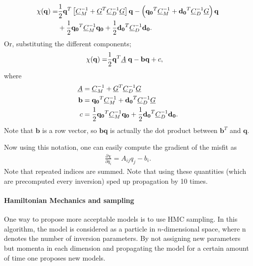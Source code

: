 \begin{align}
	\chi(\mathbf{q}) =
	&\frac{1}{2} \mathbf{q}^T \left[\underline{C}_M^{-1} +  \underline{G}^T  \underline{C}_D ^{-1} \underline{G} \right]\mathbf{q} -\left(\mathbf{q_0}^T \underline{C}_M ^{-1} + \mathbf{d_0} ^T \underline{C}_D ^{-1} \underline{G}\right) \mathbf{q}
	 \nonumber\\
	& 
	+ \frac{1}{2} \mathbf{q_0}^T \underline{C}_M ^{-1}\mathbf{q_0}
	+\frac{1}{2}\mathbf{d_0}^T \underline{C}_D ^{-1}\mathbf{d_0}.
\end{align}
Or, substituting the different components;
\begin{align}
	\chi(\mathbf{q}) =
	&\frac{1}{2}\mathbf{q}^T \underline{A} \; \mathbf{q} -\mathbf{b}  \mathbf{q} + c,
\end{align}
where
\begin{align}
	\underline{A} &= \underline{C}_M^{-1} +  \underline{G}^T  \underline{C}_D ^{-1} \underline{G} \label{eq:linear_system.misfit_A}\\
	\mathbf{b} &= \mathbf{q_0}^T \underline{C}_M ^{-1} + \mathbf{d_0} ^T \underline{C}_D ^{-1} \underline{G} \label{eq:linear_system.misfit_b}\\
	c &=  \frac{1}{2} \mathbf{q_0}^T \underline{C}_M ^{-1}\mathbf{q_0}
	+\frac{1}{2}\mathbf{d_0}^T \underline{C}_D ^{-1}\mathbf{d_0}.
\end{align}
Note that $\mathbf{b}$ is a row vector, so $\mathbf{b}\mathbf{q}$ is actually the dot product between $\mathbf{b}^T$ and $\mathbf{q}$.

Now using this notation, one can easily compute the gradient of the misfit as
\begin{gather}
	\frac{\partial \chi}{\partial q_i} = A_{ij} q_j - b_i.
\end{gather}
Note that repeated indices are summed. Note that using these quantities (which are precomputed every inversion) sped up propagation by 10 times.

\paragraph{Hamiltonian Mechanics and sampling} One way to propose more acceptable models is to use \gls{HMC} sampling. In this algorithm, the model is considered as a particle in $n$-dimensional space, where n denotes the number of inversion parameters. By not assigning new parameters but momenta in each dimension and propagating the model for a certain amount of time one proposes new models.

